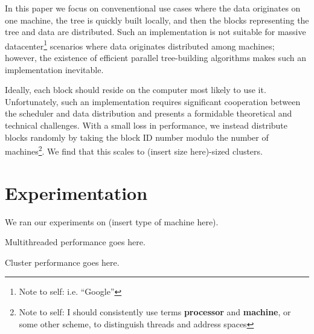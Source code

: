 \documentclass[times, leqno,twocolumn]{article}
\newcommand{\authornote}[1]{\footnote{Note to self: #1}}
\newcommand{\authorsnote}[1]{\authornote{#1}}
\newcommand{\defterm}[1]{{\bf #1}}
\begin{document}
In this paper we focus on convenentional use cases where the data originates on one machine, the tree is quickly built locally, and then the blocks representing the tree and data are distributed.
Such an implementation is not suitable for massive datacenter\authorsnote{i.e. ``Google''} scenarios where data originates distributed among machines; however, the existence of efficient parallel tree-building algorithms \cite{paralleltrees} makes such an implementation inevitable.

Ideally, each block should reside on the computer most likely to use it.
Unfortunately, such an implementation requires significant cooperation between the scheduler and data distribution and presents a formidable theoretical and technical challenges.
With a small loss in performance, we instead distribute blocks randomly by taking the block ID number modulo the number of machines\authorsnote{I should consistently use terms \defterm{processor} and \defterm{machine}, or some other scheme, to distinguish threads and address spaces}.
We find that this scales to (insert size here)-sized clusters.

\section{Experimentation}

We ran our experiments on (insert type of machine here).

Multithreaded performance goes here.

Cluster performance goes here.

\nocite{ex1,ex2}


\end{document}
